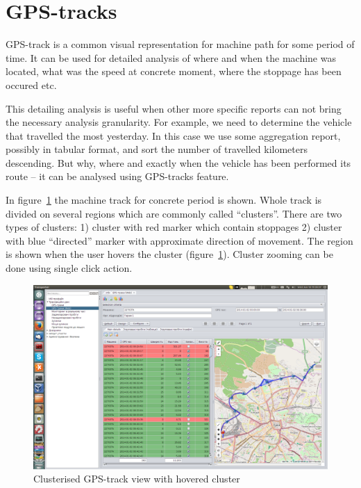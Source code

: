 \section{GPS-tracks}

GPS-track is a common visual representation for machine path for some period of time. It can be used for detailed analysis of where and when the machine was located, what was the speed at concrete moment, where the stoppage has been occured etc.

This detailing analysis is useful when other more specific reports can not bring the necessary analysis granularity. For example, we need to determine the vehicle that travelled the most yesterday. In this case we use some aggregation report, possibly in tabular format, and sort the number of travelled kilometers descending. But why, where and exactly when the vehicle has been performed its route -- it can be analysed using GPS-tracks feature.

In figure~\ref{fig:11} the machine track for concrete period is shown. Whole track is divided on several regions which are commonly called ``clusters''. There are two types of clusters: 1) cluster with red marker which contain stoppages 2) cluster with blue ``directed'' marker with approximate direction of movement. The region is shown when the user hovers the cluster (figure~\ref{fig:11}). Cluster zooming can be done using single click action. 

\begin{figure}[H]
\centering
\includegraphics[width=\linewidth]{chapters/02-gpstracks/images/11-clusterised-gps-track-view-with-hovered-cluster.png}
\caption{Clusterised GPS-track view with hovered cluster}\label{fig:11}
\end{figure}

